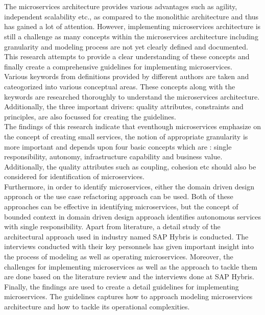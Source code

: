 \chapter{\abstractname}
The microservices architecture provides various advantages such as agility, independent scalability etc., as compared to the monolithic architecture and thus has gained a lot of attention. However, implementing microservices architecture is still a challenge as many concepts within the microservices architecture including granularity and modeling process are not yet clearly defined and documented. This research attempts to provide a clear understanding of these concepts and finally create a comprehensive guidelines for implementing microservices.\\
Various keywords from definitions provided by different authors are taken and cateogorized into various conceptual areas. These concepts along with the keywords are researched thoroughly to understand the microservices architecture. Additionally, the three important drivers: quality attributes, constraints and principles, are also focussed for creating the guidelines.\\
The findings of this research indicate that eventhough microservices emphasize on the concept of creating small services, the notion of appropriate granularity is more important and depends upon four basic concepts which are : single responsibility, autonomy, infrastructure capability and business value. Additionally, the quality attributes such as coupling, cohesion etc should also be considered for identification of microservices.\\
Furthermore, in order to identify microservices, either the domain driven design approach or the use case refactoring approach can be used. Both of these approaches can be effective in identifying microservices, but the concept of bounded context in domain driven design approach identifies autonomous services with single responsibility. Apart from literature, a detail study of the architectural approach used in industry named SAP Hybris is conducted. The interviews conducted with their key personnels has given important insight into the process of modeling as well as operating microservices. Moreover, the challenges for implementing microservices as well as the approach to tackle them are done based on the literature review and the interviews done at SAP Hybris.\\
Finally, the findings are used to create a detail guidelines for implementing microservices. The guidelines captures how to approach modeling microservices architecture and how to tackle its operational complexities.